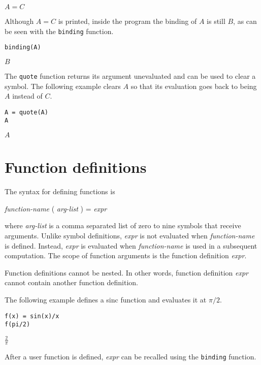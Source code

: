 \documentclass[12pt]{article}
\begin{document}
$\displaystyle A=C$

\bigskip

Although $A=C$ is printed,
inside the program the binding of $A$ is still $B$, as can be seen with
the \verb$binding$ function.

{\color{blue}
\begin{verbatim}
binding(A)
\end{verbatim}
}

$\displaystyle B$

\bigskip

The \verb$quote$ function returns its argument unevaluated
and can be used to clear a symbol.
The following example clears $A$ so that its evaluation goes back to
being $A$ instead of $C$.

{\color{blue}
\begin{verbatim}
A = quote(A)
A
\end{verbatim}
}

$\displaystyle A$

\newpage

\section{Function definitions}

The syntax for defining functions is
\begin{center}
{\it function-name} ( {\it arg-list} ) = {\it expr}
\end{center}
where {\it arg-list} is a comma separated list of zero to nine symbols that receive arguments.
Unlike symbol definitions, {\it expr} is not evaluated when {\it function-name} is defined.
Instead, {\it expr} is evaluated when {\it function-name} is used in a subsequent computation.
The scope of function arguments is the function definition {\it expr}.

\bigskip
Function definitions cannot be nested.
In other words, function definition {\it expr}
cannot contain another function definition.

\bigskip
The following example defines a sinc function and evaluates it at $\pi/2$.

{\color{blue}
\begin{verbatim}
f(x) = sin(x)/x
f(pi/2)
\end{verbatim}}

$\displaystyle \frac{2}{\pi}$

\bigskip
After a user function is defined, {\it expr} can be recalled using the
\verb$binding$ function.
\end{document}
